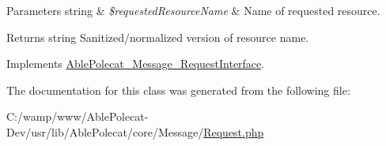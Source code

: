 \begin{DoxyParams}[1]{Parameters}
string & {\em \$requested\+Resource\+Name} & Name of requested resource.\\
\hline
\end{DoxyParams}
\begin{DoxyReturn}{Returns}
string Sanitized/normalized version of resource name. 
\end{DoxyReturn}


Implements \hyperlink{interface_able_polecat___message___request_interface_a1e05d92c1527e5fbe83db15156e54457}{Able\+Polecat\+\_\+\+Message\+\_\+\+Request\+Interface}.



The documentation for this class was generated from the following file\+:\begin{DoxyCompactItemize}
\item 
C\+:/wamp/www/\+Able\+Polecat-\/\+Dev/usr/lib/\+Able\+Polecat/core/\+Message/\hyperlink{_request_8php}{Request.\+php}\end{DoxyCompactItemize}
